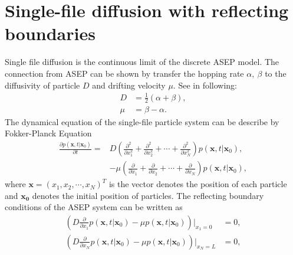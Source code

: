 
\chapter{Single-file diffusion with reflecting boundaries}
\label{append:single_file}


Single file diffusion is the continuous limit of the discrete ASEP model. The connection from ASEP can be shown by transfer the hopping rate $\alpha,~\beta$ to the diffusivity of particle $D$ and drifting velocity $\mu$. See in following:  
\begin{subequations}
    \label{eq:diffusivity_drift}
        \begin{align}
            D  & =  \frac{1}{2}(\alpha + \beta), \\
            \mu &= \beta - \alpha.
        \end{align}
\end{subequations}
The dynamical equation of the single-file particle system can be describe by Fokker-Planck Equation 
\begin{equation}
\begin{aligned}
    \label{eq:fp}
    \frac{\partial p(\mathbf{x}, t | \mathbf{x}_0)}{\partial t} = & D \left( \frac{\partial^2}{\partial x_1^2} + \frac{\partial^2}{\partial x_2^2} + \cdots+\frac{\partial^2}{\partial x_N^2}\right)p(\mathbf{x},t|\mathbf{x}_0), \\ 
    & - \mu\left(\frac{\partial}{\partial x_1} + \frac{\partial}{\partial x_2} + \cdots + \frac{\partial}{\partial x_N} \right) p(\mathbf{x}, t | \mathbf{x}_0),
\end{aligned}
\end{equation}
where $\mathbf{x}=(x_1, x_2, \cdots, x_N)^T$ is the vector denotes the position of each particle and $\mathbf{x_0}$ denotes the initial position of particles.
The reflecting boundary conditions of the ASEP system can be written as
\begin{subequations}
    \label{eq:reflecting_boundary}
    \begin{align}
        \left(D\frac{\partial}{\partial x_1}p(\mathbf{x},t|\mathbf{x}_0) -\mu p(\mathbf{x},t|\mathbf{x}_0)\right) \Bigg|_{x_1=0} & = 0, \\
        \left(D\frac{\partial}{\partial x_N}p(\mathbf{x},t|\mathbf{x}_0) -\mu p(\mathbf{x},t|\mathbf{x}_0)\right) \Bigg|_{x_N=L} & = 0,
    \end{align}
\end{subequations}
